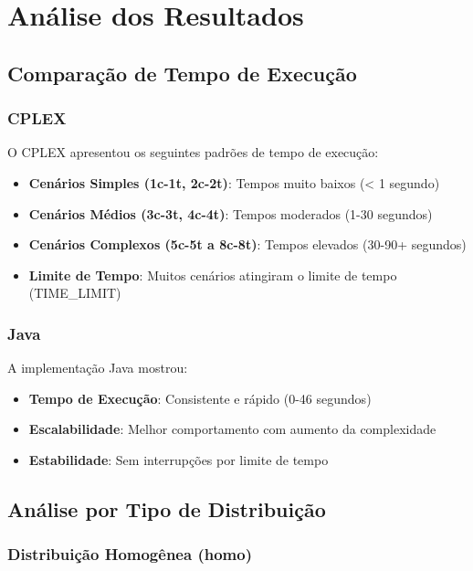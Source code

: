\documentclass[12pt,a4paper]{article}
\begin{document}
\section{Análise dos Resultados}

\subsection{Comparação de Tempo de Execução}

\subsubsection{CPLEX}

O CPLEX apresentou os seguintes padrões de tempo de execução:

\begin{itemize}
    \item \textbf{Cenários Simples (1c-1t, 2c-2t)}: Tempos muito baixos (< 1 segundo)
    \item \textbf{Cenários Médios (3c-3t, 4c-4t)}: Tempos moderados (1-30 segundos)
    \item \textbf{Cenários Complexos (5c-5t a 8c-8t)}: Tempos elevados (30-90+ segundos)
    \item \textbf{Limite de Tempo}: Muitos cenários atingiram o limite de tempo (TIME\_LIMIT)
\end{itemize}

\subsubsection{Java}

A implementação Java mostrou:

\begin{itemize}
    \item \textbf{Tempo de Execução}: Consistente e rápido (0-46 segundos)
    \item \textbf{Escalabilidade}: Melhor comportamento com aumento da complexidade
    \item \textbf{Estabilidade}: Sem interrupções por limite de tempo
\end{itemize}

\subsection{Análise por Tipo de Distribuição}

\subsubsection{Distribuição Homogênea (homo)}
\end{document}
